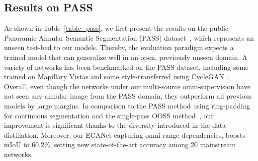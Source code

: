 \documentclass[final]{cvpr}
\begin{document}
\subsection{Results on PASS}
\label{sec:pass_results}
As shown in Table~\ref{table_pass}, we first present the results on the public Panoramic Annular Semantic Segmentation (PASS) dataset~\cite{yang2020pass}, which
represents an unseen test-bed to our models. Thereby, the evaluation paradigm expects a trained model that can generalize well in an open, previously unseen domain.
A variety of networks has been benchmarked on the PASS dataset, including some trained on Mapillary Vistas and some style-transferred using CycleGAN~\cite{yang2020pass,yang2020ds}.
Overall, even though the networks under our multi-source omni-supervision have not seen any annular image from the PASS domain, they outperform all previous models by large margins.
In comparison to the PASS method using ring-padding~\cite{payen2018eliminating} for continuous segmentation and the single-pass OOSS method~\cite{yang2020omnisupervised}, our improvement is significant thanks to the diversity introduced in the data distillation.
Moreover, our ECANet capturing omni-range dependencies, boosts mIoU to 60.2\%, setting new state-of-the-art accuracy among 20 mainstream networks.
\end{document}
